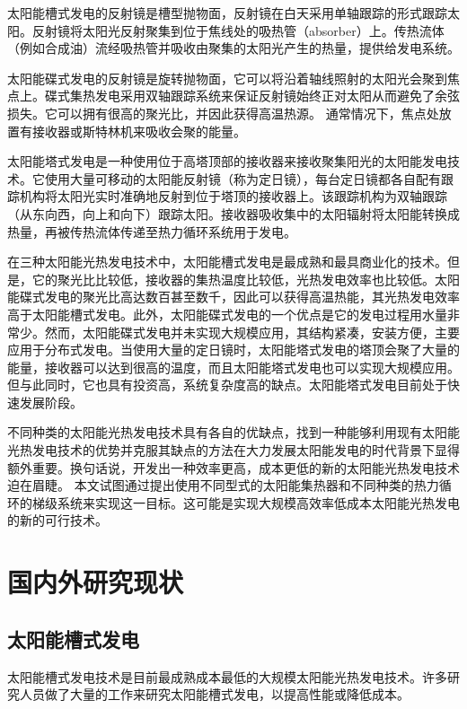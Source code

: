 太阳能槽式发电的反射镜是槽型抛物面，反射镜在白天采用单轴跟踪的形式跟踪太阳。反射镜将太阳光反射聚集到位于焦线处的吸热管（absorber）上。传热流体（例如合成油）流经吸热管并吸收由聚集的太阳光产生的热量，提供给发电系统。
 
太阳能碟式发电的反射镜是旋转抛物面，它可以将沿着轴线照射的太阳光会聚到焦点上。碟式集热发电采用双轴跟踪系统来保证反射镜始终正对太阳从而避免了余弦损失。它可以拥有很高的聚光比，并因此获得高温热源。
通常情况下，焦点处放置有接收器或斯特林机来吸收会聚的能量。

太阳能塔式发电是一种使用位于高塔顶部的接收器来接收聚集阳光的太阳能发电技术。它使用大量可移动的太阳能反射镜（称为定日镜），每台定日镜都各自配有跟踪机构将太阳光实时准确地反射到位于塔顶的接收器上。该跟踪机构为双轴跟踪（从东向西，向上和向下）跟踪太阳。接收器吸收集中的太阳辐射将太阳能转换成热量，再被传热流体传递至热力循环系统用于发电。

在三种太阳能光热发电技术中，太阳能槽式发电是最成熟和最具商业化的技术。但是，它的聚光比比较低，接收器的集热温度比较低，光热发电效率也比较低。太阳能碟式发电的聚光比高达数百甚至数千，因此可以获得高温热能，其光热发电效率高于太阳能槽式发电。此外，太阳能碟式发电的一个优点是它的发电过程用水量非常少。然而，太阳能碟式发电并未实现大规模应用，其结构紧凑，安装方便，主要应用于分布式发电。当使用大量的定日镜时，太阳能塔式发电的塔顶会聚了大量的能量，接收器可以达到很高的温度，而且太阳能塔式发电也可以实现大规模应用。但与此同时，它也具有投资高，系统复杂度高的缺点。太阳能塔式发电目前处于快速发展阶段。

不同种类的太阳能光热发电技术具有各自的优缺点，找到一种能够利用现有太阳能光热发电技术的优势并克服其缺点的方法在大力发展太阳能发电的时代背景下显得额外重要。换句话说，开发出一种效率更高，成本更低的新的太阳能光热发电技术迫在眉睫。
本文试图通过提出使用不同型式的太阳能集热器和不同种类的热力循环的梯级系统来实现这一目标。这可能是实现大规模高效率低成本太阳能光热发电的新的可行技术。

\section{国内外研究现状}

\subsection{太阳能槽式发电}

太阳能槽式发电技术是目前最成熟成本最低的大规模太阳能光热发电技术\cite{Price2002}。许多研究人员做了大量的工作来研究太阳能槽式发电，以提高性能或降低成本。

